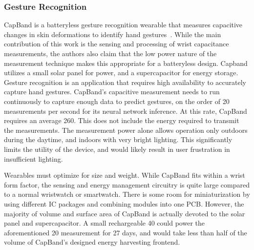 %

\subsubsection{Gesture Recognition}
CapBand is a batteryless gesture recognition wearable that measures capacitive changes in skin deformations to identify hand gestures~\cite{truong2018capband}.
While the main contribution of this work is the sensing and processing of wrist capacitance measurements, the authors also claim that the low power nature of the measurement technique makes this appropriate for a batteryless design.
Capband utilizes a small solar panel for power, and a supercapacitor for energy storage.
Gesture recognition is an application that requires high availability to accurately capture hand gestures.
CapBand's capacitive measurement needs to run continuously to capture enough data to predict gestures, on the order of 20 measurements per second for its neural network inference.
At this rate, CapBand requires an average 260\ssi{\micro\watt}. This does not include the energy required to transmit the measurements.
The measurement power alone allows operation only outdoors during the daytime, and indoors with very bright lighting. 
This significantly limits the utility of the device, and would likely result in user frustration in insufficient lighting.

Wearables must optimize for size and weight. While CapBand fits within a wrist form factor, the sensing and energy management circuitry is quite large compared to a normal wristwatch or smartwatch. There is some room for miniaturization by using different IC packages and combining modules into one PCB.  
However, the majority of volume and surface area of CapBand is actually devoted to the solar panel and supercapacitor. 
A small rechargeable 40\ssi{\milli\ampere\hour} could power the aforementioned 20\ssi{\hertz} measurement for 27 days, and would take less than half of the volume of CapBand's designed energy harvesting frontend.


